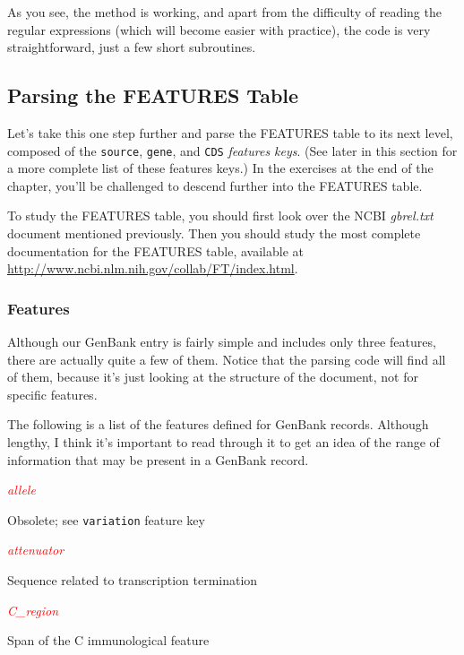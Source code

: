 As you see, the method is working, and apart from the difficulty of reading the regular expressions (which will become easier with practice), the code is very straightforward, just a few short subroutines.

\subsection{Parsing the FEATURES Table}
Let's take this one step further and parse the FEATURES table to its next level, composed of the \verb|source|, \verb|gene|, and \verb|CDS| \textit{features keys}. (See later in this section for a more complete list of these features keys.) In the exercises at the end of the chapter, you'll be challenged to descend further into the FEATURES table.

To study the FEATURES table, you should first look over the NCBI \textit{gbrel.txt} document mentioned previously. Then you should study the most complete documentation for the FEATURES table, available at \href{http://www.ncbi.nlm.nih.gov/collab/FT/index.html}{http://www.ncbi.nlm.nih.gov/collab/FT/index.html}.

\subsubsection{Features}
Although our GenBank entry is fairly simple and includes only three features, there are actually quite a few of them. Notice that the parsing code will find all of them, because it's just looking at the structure of the document, not for specific features.

The following is a list of the features defined for GenBank records. Although lengthy, I think it's important to read through it to get an idea of the range of information that may be present in a GenBank record.

\textcolor{red}{\textit{allele}}
\begin{adjustwidth}{1cm}{}
Obsolete; see \verb|variation| feature key
\end{adjustwidth}

\textcolor{red}{\textit{attenuator}}
\begin{adjustwidth}{1cm}{}
Sequence related to transcription termination
\end{adjustwidth}

\textcolor{red}{\textit{C\_region}}
\begin{adjustwidth}{1cm}{}
Span of the C immunological feature
\end{adjustwidth}

